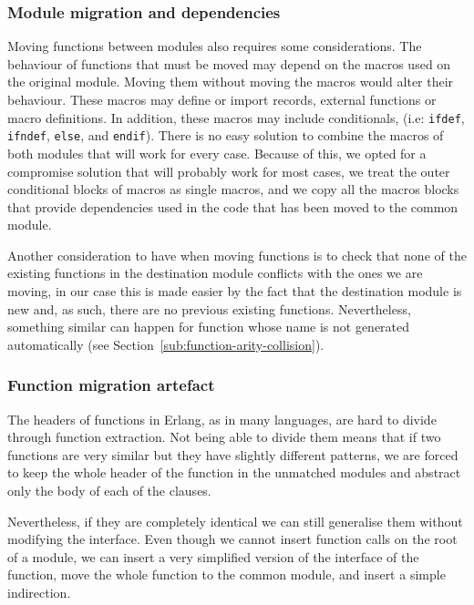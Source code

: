 \subsubsection{Module migration and dependencies}

Moving functions between modules also requires some considerations.
The behaviour of functions that must be moved may depend on the macros
used on the original module. Moving them without moving the macros
would alter their behaviour. These macros may define or import records,
external functions or macro definitions. In addition, these macros
may include conditionals, (i.e: \texttt{ifdef}, \texttt{ifndef}, \texttt{else},
and \texttt{endif}). There is no easy solution to combine the macros
of both modules that will work for every case. Because of this, we
opted for a compromise solution that will probably work for most cases,
we treat the outer conditional blocks of macros as single macros,
and we copy all the macros blocks that provide dependencies used in
the code that has been moved to the common module.

Another consideration to have when moving functions is to check that
none of the existing functions in the destination module conflicts
with the ones we are moving, in our case this is made easier by the
fact that the destination module is new and, as such, there are no
previous existing functions. Nevertheless, something similar can happen
for function whose name is not generated automatically (see 
Section~\ref{sub:function-arity-collision}).


\subsubsection{Function migration 
artefact\label{sub:function-migration-artefact}}
The headers of functions in Erlang, as in many languages, are hard to
divide through function extraction. Not being able to divide them
means that if two functions are very similar but they have slightly
different patterns, we are forced to keep the whole header of the
function in the unmatched modules and abstract only the body of each
of the clauses.

Nevertheless, if they are completely identical we can still generalise
them without modifying the interface. Even though we cannot insert
function calls on the root of a module, we can insert a very simplified
version of the interface of the function, move the whole function to the
common module, and insert a simple indirection.

